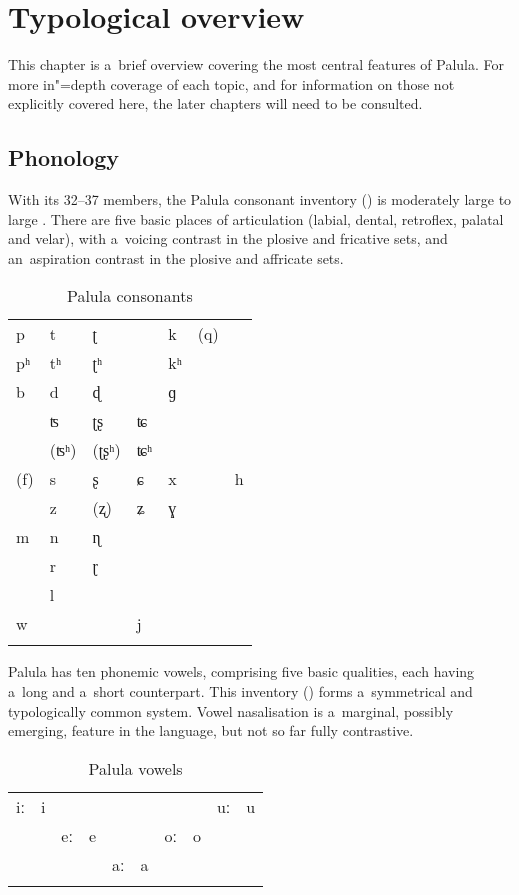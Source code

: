 \chapter{Typological overview}
\label{chap:2}

This chapter is a~brief overview covering the most central features of Palula. For more in"=depth coverage of each topic, and for information on those not explicitly covered here, the later chapters will need to be consulted.


\section{Phonology}
\label{sec:2-1}


With its 32--37 members, the Palula consonant inventory () is moderately large to large \citep{maddieson_consonant_2013}. There are five basic places of articulation (labial, dental, retroflex, palatal and velar), with a~voicing contrast in the plosive and fricative sets, and an~aspiration contrast in the plosive and affricate sets. 


\begin{table}
\caption{Palula consonants}
\begin{tabularx}{\textwidth}{ Q Q Q Q Q Q Q }
\lsptoprule
p &
t &
ʈ &
&
k &
(q) &
\\
pʰ &
tʰ &
ʈʰ &
&
kʰ &
&
\\
b &
d &
ɖ &
&
ɡ &
&
\\
&
ʦ &
ʈʂ &
ʨ &
&
&
\\
&
(ʦʰ) &
(ʈʂʰ) &
ʨʰ &
&
&
\\
(f) &
s &
ʂ &
ɕ &
x &
&
h\\
&
z &
(ʐ) &
ʑ &
ɣ &
&
\\
m &
n &
ɳ &
&
&
&
\\
&
r &
ɽ &
&
&
&
\\
&
l &
&
&
&
&
\\
w &
&
&
j &
&
&
\\\lspbottomrule
\end{tabularx}
\label{tab:2-cons}
\end{table}


Palula has ten phonemic vowels, comprising five basic qualities, each having a~long and a~short counterpart. This inventory () forms a~symmetrical and typologically common system. Vowel nasalisation is a~marginal, possibly emerging, feature in the language, but not so far fully contrastive. 


\begin{table}
\caption{Palula vowels}
\begin{tabularx}{\textwidth}{ Q Q Q Q Q Q Q Q Q Q }
\lsptoprule
iː &
i &
&
&
&
&
&
&
uː &
u\\
&
&
eː &
e &
&
&
oː &
o &
&
\\
&
&
&
&
aː &
a &
&
&
&
\\\lspbottomrule
\end{tabularx}
\label{tab:2-voc}
\end{table}


